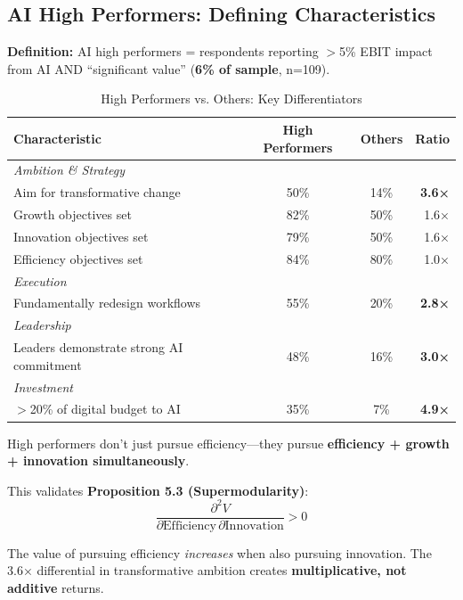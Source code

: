 \subsection{AI High Performers: Defining Characteristics}
\label{sec:vvv1-high-performers}

\textbf{Definition:} AI high performers = respondents reporting $>$5\% EBIT impact from AI AND ``significant value'' (\textbf{6\% of sample}, n=109).

\begin{table}[htbp]
\centering
\caption{High Performers vs. Others: Key Differentiators}
\label{tab:vvv1-hp}
\renewcommand{\arraystretch}{1.4}
\begin{tabular}{@{}lccr@{}}
\toprule
\textbf{Characteristic} & \textbf{High Performers} & \textbf{Others} & \textbf{Ratio} \\
\midrule
\multicolumn{4}{l}{\textit{Ambition \& Strategy}} \\
Aim for transformative change & 50\% & 14\% & \textbf{3.6×} \\
Growth objectives set & 82\% & 50\% & 1.6× \\
Innovation objectives set & 79\% & 50\% & 1.6× \\
Efficiency objectives set & 84\% & 80\% & 1.0× \\
\midrule
\multicolumn{4}{l}{\textit{Execution}} \\
Fundamentally redesign workflows & 55\% & 20\% & \textbf{2.8×} \\
\midrule
\multicolumn{4}{l}{\textit{Leadership}} \\
Leaders demonstrate strong AI commitment & 48\% & 16\% & \textbf{3.0×} \\
\midrule
\multicolumn{4}{l}{\textit{Investment}} \\
$>$20\% of digital budget to AI & 35\% & 7\% & \textbf{4.9×} \\
\bottomrule
\end{tabular}
\end{table}

\begin{tcolorbox}[colback=green!5!white, colframe=green!75!black,
    title=EBF Framework Implication: Supermodularity in Objectives]

High performers don't just pursue efficiency---they pursue \textbf{efficiency + growth + innovation simultaneously}.

This validates \textbf{Proposition 5.3 (Supermodularity)}:
\begin{equation}
\frac{\partial^2 V}{\partial \text{Efficiency} \, \partial \text{Innovation}} > 0
\end{equation}

The value of pursuing efficiency \textit{increases} when also pursuing innovation. The 3.6× differential in transformative ambition creates \textbf{multiplicative, not additive} returns.

\end{tcolorbox}


